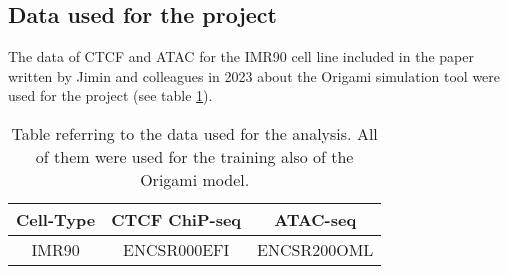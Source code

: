 \subsection{Data used for the project}
The data of CTCF and ATAC for the IMR90 cell line included in the paper written by Jimin and colleagues in 2023 about the Origami simulation tool
\cite{tanCelltypespecificPrediction3D2023}
were used for the project (see table \ref{tab:data}).

\begin{table}[H]
    \centering
    \begin{tabular}{|c|c|c|}
        \hline
        \textbf{Cell-Type} & \textbf{CTCF ChiP-seq} & \textbf{ATAC-seq}\\
        \hline
        IMR90 & ENCSR000EFI & ENCSR200OML\\
        \hline
    \end{tabular}
    \caption{Table referring to the data used for the analysis. All of them were used for the training also of the Origami\cite{tanCelltypespecificPrediction3D2023} model.}
    \label{tab:data}
\end{table}

